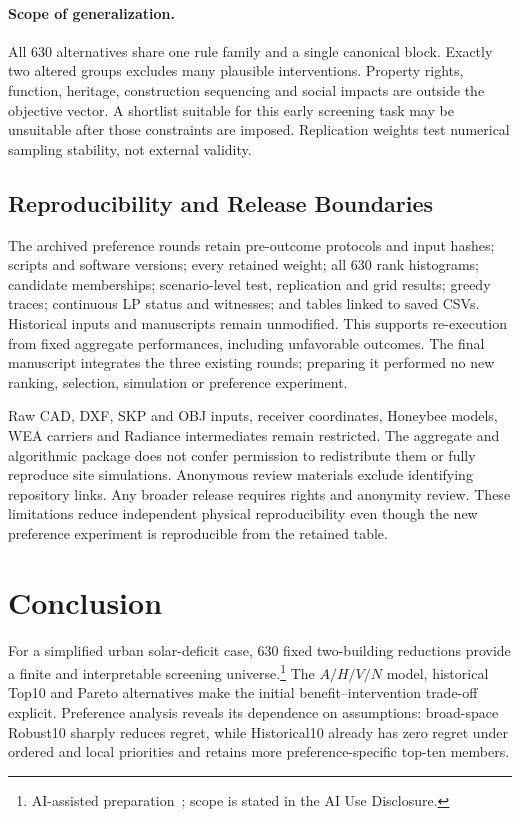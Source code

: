 \documentclass{llncs}
\newcommand{\aidraft}{\footnote{AI-assisted preparation~\cite{openai2026}; scope is stated in the AI Use Disclosure.}}
\begin{document}
\paragraph{Scope of generalization.} All 630 alternatives share one rule family and a single canonical block. Exactly two altered groups excludes many plausible interventions. Property rights, function, heritage, construction sequencing and social impacts are outside the objective vector. A shortlist suitable for this early screening task may be unsuitable after those constraints are imposed. Replication weights test numerical sampling stability, not external validity.

\subsection{Reproducibility and Release Boundaries}
The archived preference rounds retain pre-outcome protocols and input hashes; scripts and software versions; every retained weight; all 630 rank histograms; candidate memberships; scenario-level test, replication and grid results; greedy traces; continuous LP status and witnesses; and tables linked to saved CSVs. Historical inputs and manuscripts remain unmodified. This supports re-execution from fixed aggregate performances, including unfavorable outcomes. The final manuscript integrates the three existing rounds; preparing it performed no new ranking, selection, simulation or preference experiment.

Raw CAD, DXF, SKP and OBJ inputs, receiver coordinates, Honeybee models, WEA carriers and Radiance intermediates remain restricted. The aggregate and algorithmic package does not confer permission to redistribute them or fully reproduce site simulations. Anonymous review materials exclude identifying repository links. Any broader release requires rights and anonymity review. These limitations reduce independent physical reproducibility even though the new preference experiment is reproducible from the retained table.

\section{Conclusion}
For a simplified urban solar-deficit case, 630 fixed two-building reductions provide a finite and interpretable screening universe.\aidraft{} The $A/H/V/N$ model, historical Top10 and Pareto alternatives make the initial benefit--intervention trade-off explicit. Preference analysis reveals its dependence on assumptions: broad-space Robust10 sharply reduces regret, while Historical10 already has zero regret under ordered and local priorities and retains more preference-specific top-ten members.
\end{document}
